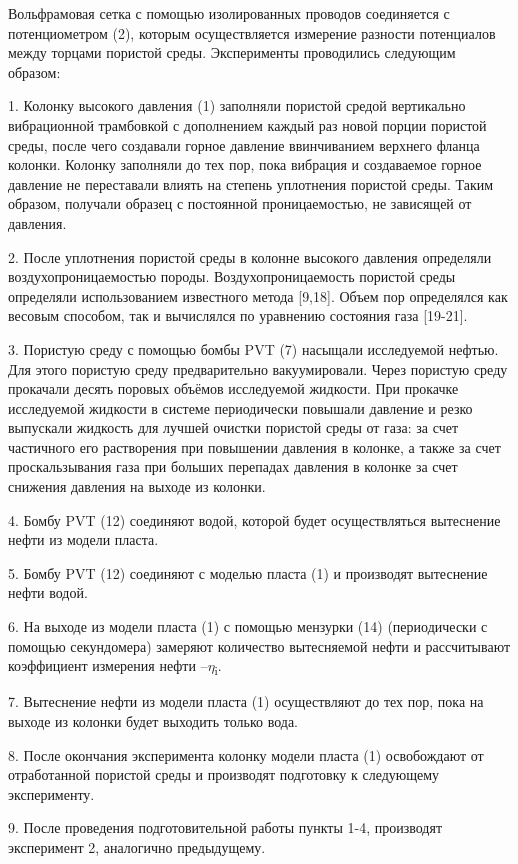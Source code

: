 {{Вольфрамовая сетка с помощью изолированных проводов соединяется с
потенциометром (2), которым осуществляется измерение разности
потенциалов между торцами пористой среды. Эксперименты проводились
следующим образом:

1. Колонку высокого давления (1) заполняли пористой средой вертикально
вибрационной трамбовкой с дополнением каждый раз новой порции пористой
среды, после чего создавали горное давление ввинчиванием верхнего фланца
колонки. Колонку заполняли до тех пор, пока вибрация и создаваемое
горное давление не переставали влиять на степень уплотнения пористой
среды. Таким образом, получали образец с постоянной проницаемостью, не
зависящей от давления.

2. После уплотнения пористой среды в колонне высокого давления
определяли воздухопроницаемостью породы. Воздухопроницаемость пористой
среды определяли использованием известного метода {[}9,18{]}. Объем пор
определялся как весовым способом, так и вычислялся по уравнению
состояния газа {[}19-21{]}.

3. Пористую среду с помощью бомбы PVT (7) насыщали исследуемой нефтью.
Для этого пористую среду предварительно вакуумировали. Через пористую
среду прокачали десять поровых объёмов исследуемой жидкости. При
прокачке исследуемой жидкости в системе периодически повышали давление и
резко выпускали жидкость для лучшей очистки пористой среды от газа: за
счет частичного его растворения при повышении давления в колонке, а
также за счет проскальзывания газа при больших перепадах давления в
колонке за счет снижения давления на выходе из колонки.

4. Бомбу PVT (12) соединяют водой, которой будет осуществляться
вытеснение нефти из модели пласта.

5. Бомбу PVT (12) соединяют с моделью пласта (1) и производят вытеснение
нефти водой.

6. На выходе из модели пласта (1) с помощью мензурки (14) (периодически
с помощью секундомера) замеряют количество вытесняемой нефти и
рассчитывают коэффициент измерения нефти --\(\eta\)\textsubscript{i}.

7. Вытеснение нефти из модели пласта (1) осуществляют до тех пор, пока
на выходе из колонки будет выходить только вода.

8. После окончания эксперимента колонку модели пласта (1) освобождают от
отработанной пористой среды и производят подготовку к следующему
эксперименту.

9. После проведения подготовительной работы пункты 1-4, производят
эксперимент 2, аналогично предыдущему.

}}
